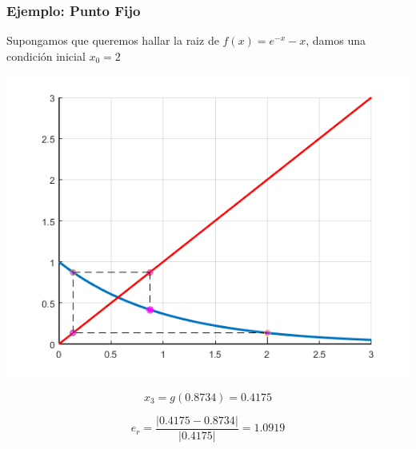 \documentclass[xcolor=svgnames]{beamer} %
\theoremstyle{plain}
\theoremstyle{definition}
\begin{document}
\begin{frame}
\frametitle{Ejemplo: Punto Fijo}

Supongamos que queremos hallar la raiz de $f(x) = e^{-x} -x$,
damos una condición inicial $x_0=2$


\begin{minipage}{.45\linewidth}
\includegraphics[width=\linewidth]{fp_example/iter3.png} 

\end{minipage}  \begin{minipage}{.45\linewidth}
$$ x_3 = g(0.8734) = 0.4175$$

$$e_r = \frac{|0.4175-0.8734|}{|0.4175|} = 1.0919$$
\end{minipage}
\end{frame}
\end{document}
